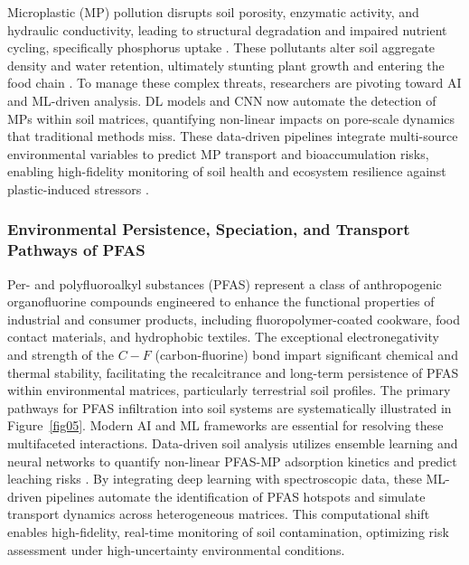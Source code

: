 \documentclass[sn-mathphys-num]{sn-jnl}
\begin{document}
Microplastic (MP) pollution disrupts soil porosity, enzymatic activity, and
hydraulic conductivity, leading to structural degradation and impaired
nutrient cycling, specifically phosphorus uptake
\cite{Akdogan2019,Zhou2024,Wang2022}. These pollutants alter soil aggregate
density and water retention, ultimately stunting plant growth and entering
the food chain \cite{Jing2023,LindhLemenkova2023d,Chenetal2025}. To manage
these complex threats, researchers are pivoting toward AI and ML-driven
analysis. DL models and CNN now automate the detection of MPs within soil
matrices, quantifying non-linear impacts on pore-scale dynamics that
traditional methods miss. These data-driven pipelines integrate multi-source
environmental variables to predict MP transport and bioaccumulation risks,
enabling high-fidelity monitoring of soil health and ecosystem resilience
against plastic-induced stressors \cite{Chen2020,LindhLemenkova2023e}.

\subsubsection{Environmental Persistence, Speciation, and Transport Pathways
    of PFAS}\label{sec2.1.4}

Per- and polyfluoroalkyl substances (PFAS) represent a class of anthropogenic
organofluorine compounds engineered to enhance the functional properties of
industrial and consumer products, including fluoropolymer-coated cookware,
food contact materials, and hydrophobic textiles. The exceptional
electronegativity and strength of the $C-F$ (carbon-fluorine) bond impart
significant chemical and thermal stability, facilitating the recalcitrance
and long-term persistence of PFAS within environmental matrices, particularly
terrestrial soil profiles. The primary pathways for PFAS infiltration into
soil systems are systematically illustrated in Figure~\ref{fig05}. Modern AI
and ML frameworks are essential for resolving these multifaceted interactions.
Data-driven soil analysis utilizes ensemble learning and neural networks to
quantify non-linear PFAS-MP adsorption kinetics and predict leaching risks
\cite{Xu2023}. By integrating deep learning with spectroscopic data, these
ML-driven pipelines automate the identification of PFAS hotspots and simulate
transport dynamics across heterogeneous matrices. This computational shift
enables high-fidelity, real-time monitoring of soil contamination, optimizing
risk assessment under high-uncertainty environmental conditions.
\end{document}
